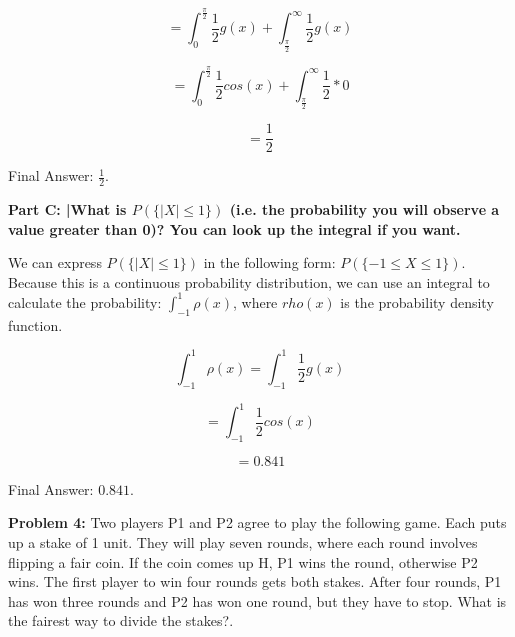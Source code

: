 \documentclass{article}
\begin{document}
 \begin{displaymath}
     = \int_{0}^{\frac{\pi}{2}}\frac{1}{2}g(x) + \int_{\frac{\pi}{2}}^{\infty}\frac{1}{2}g(x)
 \end{displaymath}
 
 \begin{displaymath}
     = \int_{0}^{\frac{\pi}{2}}\frac{1}{2}cos(x) + \int_{\frac{\pi}{2}}^{\infty}\frac{1}{2}*0
 \end{displaymath}
 
 \begin{displaymath}
     = \frac{1}{2}
 \end{displaymath}
 
 Final Answer: $\frac{1}{2}$.\newline
 
 \textbf{Part C: |What is $P(\{|X| \leq 1\})$ (i.e. the probability you will observe a value greater than 0)? You can look up the integral if you want.}\newline
 
 We can express $P(\{|X| \leq 1\})$ in the following form: $P(\{-1 \leq X \leq 1\})$. Because this is a continuous probability distribution, we can use an integral to calculate the probability: $\int_{-1}^{1}\rho(x)$, where $rho(x)$ is the probability density function.
 
 \begin{displaymath}
    \int_{-1}^{1}\rho(x) = \int_{-1}^{1}\frac{1}{2}g(x)
 \end{displaymath}
  
 \begin{displaymath}
    = \int_{-1}^{1}\frac{1}{2}cos(x)
 \end{displaymath}
 
 \begin{displaymath}
    = 0.841
 \end{displaymath}
 
 Final Answer: $0.841$.\newline
 
 \newpage
 
 \begin{center}
      \Large\textbf{Problem 4:} Two players P1 and P2 agree to play the following game. Each puts up a stake of 1 unit. They will play seven rounds, where each round involves flipping a fair coin. If the coin comes up H, P1 wins the round, otherwise P2 wins. The first player to win four rounds gets both stakes. After four rounds, P1 has won three rounds and P2 has won one round, but they have to stop. What is the fairest way to divide the stakes?.\par
 \end{center}
 
\end{document}

